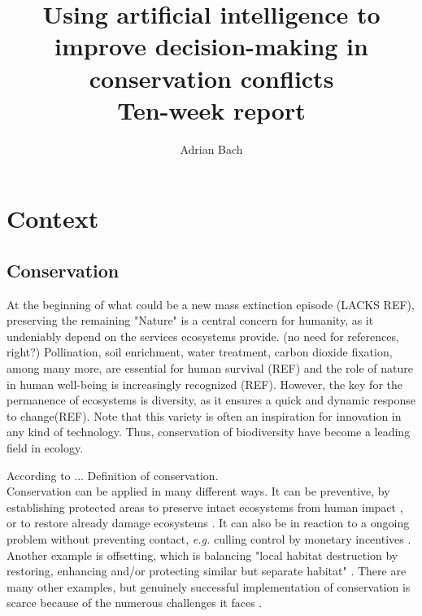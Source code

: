 \documentclass[12pt,a4paper]{article}
\author{Adrian Bach}
\title{Using artificial intelligence to improve decision-making in conservation conflicts \\\medskip Ten-week report}
\begin{document}
\maketitle

\tableofcontents

\newpage
\section{Context}
\subsection{Conservation}

At the beginning of what could be a new mass extinction episode (LACKS REF), preserving the remaining "Nature" is a central concern for humanity, as it undeniably depend on the services ecosystems provide. (no need for references, right?)
Pollination, soil enrichment, water treatment, carbon dioxide fixation, among many more, are essential for human survival (REF) and the role of nature in human well-being is increasingly recognized (REF).
However, the key for the permanence of ecosystems is diversity, as it ensures a quick and dynamic response to change(REF).
Note that this variety is often an inspiration for innovation in any kind of technology.
Thus, conservation of biodiversity have become a leading field in ecology.
%
%

According to ... Definition of conservation.\\
Conservation can be applied in many different ways.
It can be preventive, by establishing protected areas to preserve intact ecosystems from human impact \citep{vanwilgen2011critical, bainbridge2017goose}, or to restore already damage ecosystems \citep{rumpff2011state}. 
It can also be in reaction to a ongoing problem without preventing contact, \textit{e.g.} culling control by monetary incentives \citep{mason2017changing, cusack2018time}.
Another example is offsetting, which is balancing "local habitat destruction by restoring, enhancing and/or protecting similar but separate habitat" \citep{gordon2011assessing}.
There are many other examples, but genuinely successful implementation of conservation is scarce because of the numerous challenges it faces \citep{keith2011uncertainty, vanwilgen2011critical}.\\
%
\end{document}
